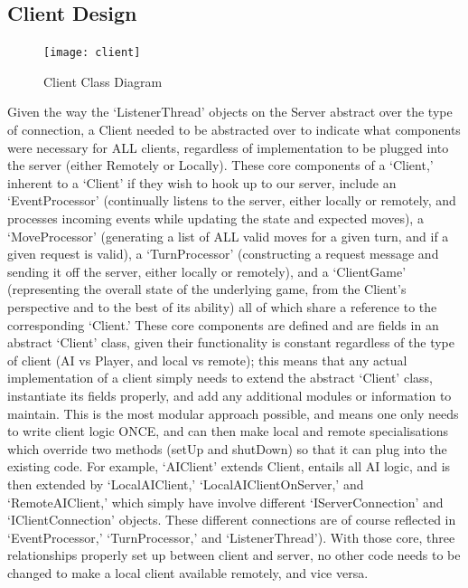 \documentclass[a4paper,doc,draftfirst]{apa6}
\begin{document}
\subsection{Client Design}
\begin{figure}[hbtp]
      \texttt{[image: client]}
      \caption{Client Class Diagram}
\end{figure}
Given the way the ‘ListenerThread’ objects on the Server abstract over the type of connection, a Client needed to be abstracted over to indicate what components were necessary for ALL clients, regardless of implementation to be plugged into the server (either Remotely or Locally). These core components of a ‘Client,’ inherent to a ‘Client’ if they wish to hook up to our server, include an ‘EventProcessor’ (continually listens to the server, either locally or remotely, and processes incoming events while updating the state and expected moves), a ‘MoveProcessor’ (generating a list of ALL valid moves for a given turn, and if a given request is valid), a ‘TurnProcessor’ (constructing a request message and sending it off the server, either locally or remotely), and a ‘ClientGame’ (representing the overall state of the underlying game, from the Client’s perspective and to the best of its ability) all of which share a reference to the corresponding ‘Client.’ These core components are defined and are fields in an abstract ‘Client’ class, given their functionality is constant regardless of the type of client (AI vs Player, and local vs remote); this means that any actual implementation of a client simply needs to extend the abstract ‘Client’ class, instantiate its fields properly, and add any additional modules or information to maintain. This is the most modular approach possible, and means one only needs to write client logic ONCE, and can then make local and remote specialisations which override two methods (setUp and shutDown) so that it can plug into the existing code. For example, ‘AIClient’ extends Client, entails all AI logic, and is then extended by ‘LocalAIClient,’ ‘LocalAIClientOnServer,’ and ‘RemoteAIClient,’ which simply have involve different ‘IServerConnection’ and ‘IClientConnection’ objects. These different connections are of course reflected in ‘EventProcessor,’ ‘TurnProcessor,’ and ‘ListenerThread’). With those core, three relationships properly set up between client and server, no other code needs to be changed to make a local client available remotely, and vice versa.
\end{document}
